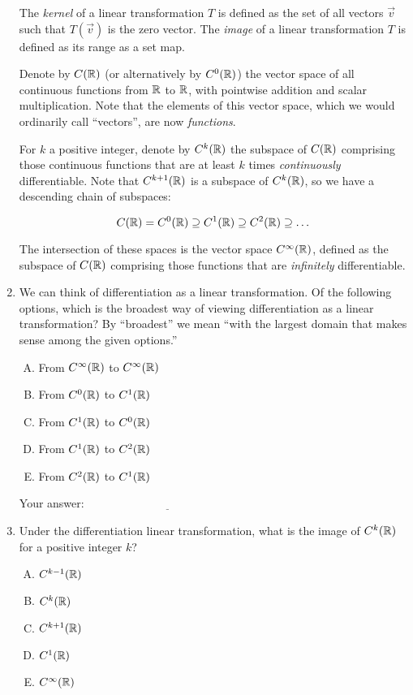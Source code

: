 \documentclass[10pt]{amsart}
\begin{document}
\begin{enumerate}
  The {\em kernel} of a linear transformation $T$ is defined as the
  set of all vectors $\vec{v}$ such that $T(\vec{v})$ is the zero
  vector. The {\em image} of a linear transformation $T$ is defined as
  its range as a set map.

  Denote by $C(\mathbb{R})$ (or alternatively by $C^0(\mathbb{R})$) the vector space
  of all continuous functions from $\mathbb{R}$ to $\mathbb{R}$, with pointwise
  addition and scalar multiplication. Note that the elements of this
  vector space, which we would ordinarily call ``vectors'', are now
  {\em functions}.

  For $k$ a positive integer, denote by $C^k(\mathbb{R})$ the subspace of
  $C(\mathbb{R})$ comprising those continuous functions that are at least $k$
  times {\em continuously} differentiable. Note that $C^{k+1}(\mathbb{R})$ is
  a subspace of $C^k(\mathbb{R})$, so we have a descending chain of subspaces:

  $$C(\mathbb{R}) = C^0(\mathbb{R}) \supseteq C^1(\mathbb{R}) \supseteq C^2(\mathbb{R}) \supseteq \dots $$

  The intersection of these spaces is the vector space $C^\infty(\mathbb{R})$,
  defined as the subspace of $C(\mathbb{R})$ comprising those functions that
  are {\em infinitely} differentiable.

\item We can think of differentiation as a linear transformation. Of
  the following options, which is the broadest way of viewing
  differentiation as a linear transformation? By ``broadest'' we mean
  ``with the largest domain that makes sense among the given options.''

  \begin{enumerate}[(A)]
  \item From $C^\infty(\mathbb{R})$ to $C^\infty(\mathbb{R})$
  \item From $C^0(\mathbb{R})$ to $C^1(\mathbb{R})$
  \item From $C^1(\mathbb{R})$ to $C^0(\mathbb{R})$
  \item From $C^1(\mathbb{R})$ to $C^2(\mathbb{R})$
  \item From $C^2(\mathbb{R})$ to $C^1(\mathbb{R})$
  \end{enumerate}

  \vspace{0.1in}
  Your answer: $\underline{\qquad\qquad\qquad\qquad\qquad\qquad\qquad}$
  \vspace{0.1in}

\item Under the differentiation linear transformation, what is the
  image of $C^k(\mathbb{R})$ for a positive integer $k$?

  \begin{enumerate}[(A)]
  \item $C^{k-1}(\mathbb{R})$
  \item $C^k(\mathbb{R})$
  \item $C^{k+1}(\mathbb{R})$
  \item $C^1(\mathbb{R})$
  \item $C^\infty(\mathbb{R})$
  \end{enumerate}


\end{enumerate}
\end{document}
